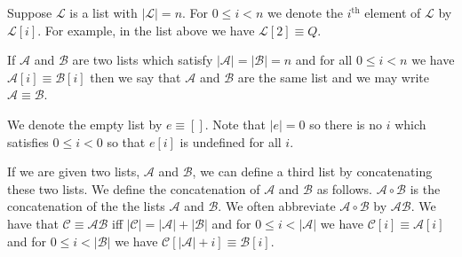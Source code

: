 \documentclass[12pt]{article}
\newcommand{\mc}[1]{\mathcal{#1}}
\begin{document}
Suppose $\mc{L}$ is a list with $|\mathcal{L}| = n$.
For $0 \le i < n$ we denote the $i^{\text{th}}$ element of $\mc{L}$ by $\mc{L}[i]$.
For example, in the list above we have $\mc{L}[2] \equiv Q$.

If $\mc{A}$ and $\mc{B}$ are two lists which satisfy $|\mc{A}| = |\mc{B}| = n$ and for all $0 \le i < n$ we have $\mc{A}[i] \equiv \mc{B}[i]$ then we say that $\mc{A}$ and $\mc{B}$ are the same list and we may write $\mc{A} \equiv \mc{B}$.

We denote the empty list by $e \equiv []$.
Note that $|e| = 0$ so there is no $i$ which satisfies $0 \le i < 0$ so that $e[i]$ is undefined for all $i$.

If we are given two lists, $\mc{A}$ and $\mc{B}$, we can define a third list by concatenating these two lists.
We define the concatenation of $\mc{A}$ and $\mc{B}$ as follows.
$\mc{A} \circ \mc{B}$ is the concatenation of the the lists $\mc{A}$ and $\mc{B}$.
We often abbreviate $\mc{A}\circ\mc{B}$ by $\mc{A}\mc{B}$.
We have that $\mc{C} \equiv \mc{A}\mc{B}$ iff $|\mc{C}| = |\mc{A}| + |\mc{B}|$ and for $0 \le i < |\mc{A}|$ we have $\mc{C}[i] \equiv \mc{A}[i]$ and for $0 \le i < |\mc{B}|$ we have $\mc{C}[|\mc{A}| + i] \equiv \mc{B}[i]$.
\end{document}

